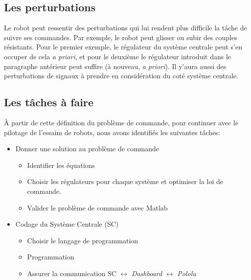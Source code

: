 \subsection{Les perturbations}
Le robot peut ressentir des perturbations qui lui rendent plus difficile la tâche de suivre ses commandes. Par exemple, le robot peut glisser ou subir des couples résistants. Pour le premier exemple, le régulateur du système centrale peut s'en occuper de cela \textit{a priori}, et pour le deuxième le régulateur introduit dans le paragraphe antérieur peut suffire (à nouveau, \textit{a priori}). Il y'aura aussi des perturbations de signaux à prendre en considération du coté système centrale.

\subsection{Les tâches à faire}

À partir de cette définition du problème de commande, pour continuer avec le pilotage de l'essaim de robots, nous avons identifiés les suivantes tâches: 

\begin{itemize}
    \item Donner une solution au problème de commande
    \begin{itemize}
        \item Identifier les équations
        \item Choisir les régulateurs pour chaque système et optimiser la loi de commande.
        \item Valider le problème de commande avec Matlab
    \end{itemize}
    \item Codage du Système Centrale (SC)
    \begin{itemize}
        \item Choisir le langage de programmation
        \item Programmation
        \item Assurer la communication SC $\leftrightarrow$ \textit{Dashboard} $\leftrightarrow$ \textit{Pololu}
    \end{itemize}
\end{itemize}
